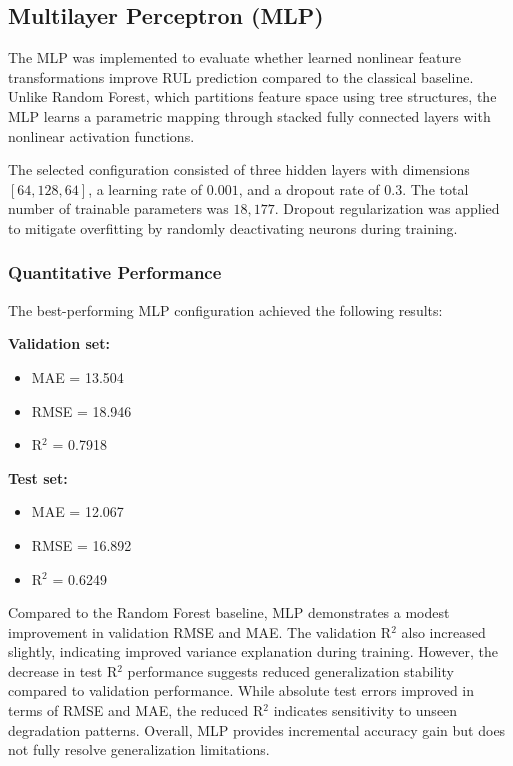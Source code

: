 \documentclass[conference]{IEEEtran}
\begin{document}
\subsection{Multilayer Perceptron (MLP)}

The MLP was implemented to evaluate whether learned nonlinear feature transformations improve RUL prediction compared to the classical baseline. Unlike Random Forest, which partitions feature space using tree structures, the MLP learns a parametric mapping through stacked fully connected layers with nonlinear activation functions.

The selected configuration consisted of three hidden layers with dimensions $[64, 128, 64]$, a learning rate of $0.001$, and a dropout rate of $0.3$. The total number of trainable parameters was $18,177$. Dropout regularization was applied to mitigate overfitting by randomly deactivating neurons during training.

\subsubsection{Quantitative Performance}
The best-performing MLP configuration achieved the following results:

\textbf{Validation set:}
\begin{itemize}
    \item MAE = 13.504
    \item RMSE = 18.946
    \item R$^2$ = 0.7918
\end{itemize}

\textbf{Test set:}
\begin{itemize}
    \item MAE = 12.067
    \item RMSE = 16.892
    \item R$^2$ = 0.6249
\end{itemize}

Compared to the Random Forest baseline, MLP demonstrates a modest improvement in validation RMSE and MAE. The validation R$^2$ also increased slightly, indicating improved variance explanation during training. However, the decrease in test R$^2$ performance suggests reduced generalization stability compared to validation performance. While absolute test errors improved in terms of RMSE and MAE, the reduced R$^2$ indicates sensitivity to unseen degradation patterns. Overall, MLP provides incremental accuracy gain but does not fully resolve generalization limitations.
\end{document}
